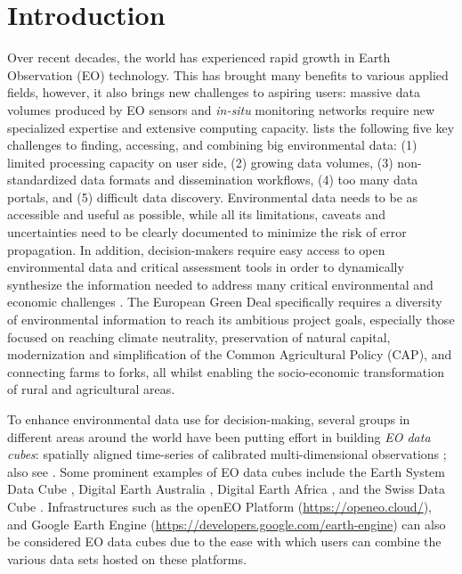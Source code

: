\newpage

\section{Introduction}

Over recent decades, the world has experienced rapid growth in Earth Observation (EO) technology. This has brought many benefits to various applied fields, however, it also brings new challenges to aspiring users: massive data volumes produced by EO sensors and \emph{in-situ} monitoring networks require new specialized expertise and extensive computing capacity. \citet{wagemann2021a} lists the following five key challenges to finding, accessing, and combining big environmental data: (1) limited processing capacity on user side, (2) growing data volumes, (3) non-standardized data formats and dissemination workflows, (4) too many data portals, and (5) difficult data discovery. Environmental data needs to be as accessible and useful as possible, while all its limitations, caveats and uncertainties need to be clearly documented to minimize the risk of error propagation. In addition, decision-makers require easy access to open environmental data and critical assessment tools in order to dynamically synthesize the information needed to address many critical environmental and economic challenges \citep{giuliani2017building}. The European Green Deal specifically \citep{sikora2021european} requires a diversity of environmental information to reach its ambitious project goals, especially those focused on reaching climate neutrality, preservation of natural capital, modernization and simplification of the Common Agricultural Policy (CAP), and connecting farms to forks, all whilst enabling the socio-economic transformation of rural and agricultural areas. 

To enhance environmental data use for decision-making, several groups in different areas around the world have been putting effort in building \emph{EO data cubes}: spatially aligned time-series of calibrated multi-dimensional observations \citep{giuliani2017building}; also see \citet{lu2018multidimensional, liu2021production, mirmazloumi2022elulc}. Some prominent examples of EO data cubes include the Earth System Data Cube \citep{mahecha2020earth}, Digital Earth Australia \citep{lucas2019land}, Digital Earth Africa \citep{fang2021analysis}, and the Swiss Data Cube \citep{chatenoux2021swiss}. Infrastructures such as the openEO Platform (\url{https://openeo.cloud/}), and Google Earth Engine (\url{https://developers.google.com/earth-engine}) can also be considered EO data cubes \citep{giuliani2020data} due to the ease with which users can combine the various data sets hosted on these platforms.

